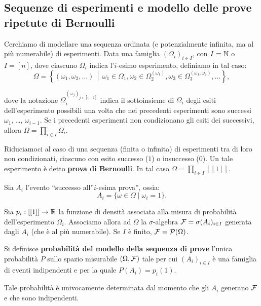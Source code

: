 \begin{multicols*}{2}
\subsection{Sequenze di esperimenti e modello delle prove ripetute di Bernoulli}

    Cerchiamo di modellare una sequenza ordinata (e potenzialmente infinita,
    ma al più numerabile)
    di esperimenti. Data una famiglia $(\Omega_i)_{i \in I}$, con $I = \mathbb{N}$ o
    $I = [n]$, dove ciascuno $\Omega_i$ indica l'$i$-esimo esperimento, definiamo
    in tal caso:
    \[ 
        \Omega = \left\{ (\omega_1, \omega_2, \ldots) \,\middle\vert\, \omega_1 \in \Omega_1, \omega_2 \in \Omega_2^{(\omega_1)}, \omega_3 \in \Omega_3^{(\omega_1, \omega_2)}, \ldots\right\},
    \]

    dove la notazione $\Omega_i^{(\omega_j)_{j \in [i-1]}}$ indica il sottoinsieme
    di $\Omega_i$ degli esiti dell'esperimento possibili una volta che nei precedenti
    esperimenti sono successi $\omega_1$, \ldots, $\omega_{i-1}$. Se i precedenti
    esperimenti non condizionano gli esiti dei successivi, allora
    $\Omega = \prod_{i \in I} \Omega_i$. \medskip


    Riduciamoci al caso di una sequenza (finita o infinita) di esperimenti tra di
    loro non condizionati, ciascuno
    con esito successo ($1$) o insuccesso ($0$). Un tale esperimento è
    detto \textbf{prova di Bernoulli}. In tal caso $\Omega = \prod_{i \in I} [[1]]$. \medskip
    
    
    Sia $A_i$ l'evento ``successo all''$i$-esima prova'', ossia:
    \[
        A_i = \{ \omega \in \Omega \mid \omega_i = 1 \}.
    \]

    Sia $p_i : [[1]] \to \mathbb{R}$ la funzione di densità associata alla misura
    di probabilità dell'esperimento $\Omega_i$. Associamo allora ad $\Omega$ la $\sigma$-algebra $\mathcal{F} = \sigma(A_i)_{i \in I}$ generata
    dagli $A_i$ (che è al più numerabile). Se $I$ è finito, $\mathcal{F} = \mathcal{P}(\Omega)$.

    \begin{definition}
        Si definisce \textbf{probabilità del modello della sequenza di prove}
        l'unica probabilità $P$ sullo spazio misurabile $(\Omega, \mathcal{F})$ tale
        per cui $(A_i)_{i \in I}$ è una famiglia di eventi indipendenti e
        per la quale $P(A_i) = p_i(1)$.
    \end{definition}

    \begin{remark}
        Tale probabilità è univocamente determinata dal momento che
        gli $A_i$ generano $\mathcal{F}$ e che sono indipendenti.
    \end{remark}


\end{multicols*}
